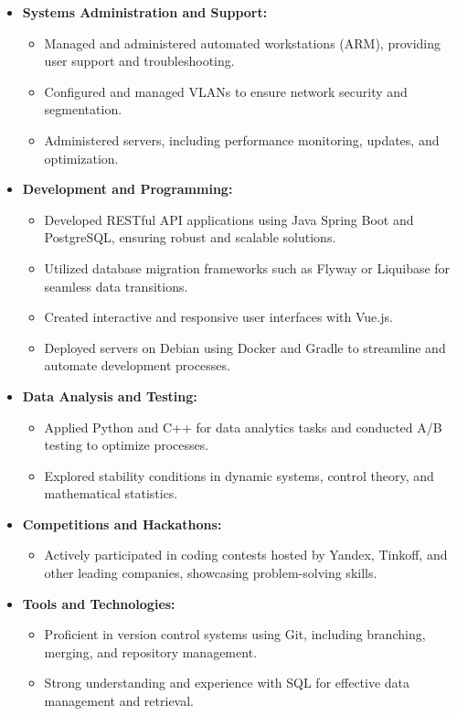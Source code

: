 \documentclass[a4paper,10pt]{article}
\begin{document}
\begin{itemize}
    \item \textbf{Systems Administration and Support:}
    \begin{itemize}
        \item Managed and administered automated workstations (ARM), providing user support and troubleshooting.
        \item Configured and managed VLANs to ensure network security and segmentation.
        \item Administered servers, including performance monitoring, updates, and optimization.
    \end{itemize}

    \item \textbf{Development and Programming:}
    \begin{itemize}
        \item Developed RESTful API applications using Java Spring Boot and PostgreSQL, ensuring robust and scalable solutions.
        \item Utilized database migration frameworks such as Flyway or Liquibase for seamless data transitions.
        \item Created interactive and responsive user interfaces with Vue.js.
        \item Deployed servers on Debian using Docker and Gradle to streamline and automate development processes.
    \end{itemize}

    \item \textbf{Data Analysis and Testing:}
    \begin{itemize}
        \item Applied Python and C++ for data analytics tasks and conducted A/B testing to optimize processes.
        \item Explored stability conditions in dynamic systems, control theory, and mathematical statistics.
    \end{itemize}

    \item \textbf{Competitions and Hackathons:}
    \begin{itemize}
        \item Actively participated in coding contests hosted by Yandex, Tinkoff, and other leading companies, showcasing problem-solving skills.
    \end{itemize}

    \item \textbf{Tools and Technologies:}
    \begin{itemize}
        \item Proficient in version control systems using Git, including branching, merging, and repository management.
        \item Strong understanding and experience with SQL for effective data management and retrieval.
    \end{itemize}
\end{itemize}
\end{document}
